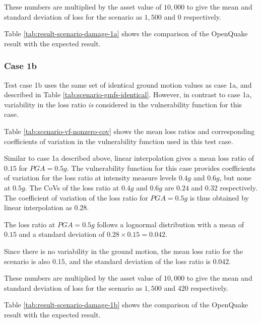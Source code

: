 These numbers are multiplied by the asset value of $10,000$ to give the mean and standard deviation of loss for the scenario as $1,500$ and $0$ respectively.



Table \ref{tab:result-scenario-damage-1a} shows the comparison of the OpenQuake result with the expected result.

\subsubsection{Case 1b}
Test case 1b uses the same set of identical ground motion values as case 1a, and described in Table \ref{tab:scenario-gmfs-identical}. However, in contrast to case 1a, variability in the loss ratio \emph{is} considered in the vulnerability function for this case.



Table \ref{tab:scenario-vf-nonzero-cov} shows the mean loss ratios and corresponding coefficients of variation in the vulnerability function used in this test case.

Similar to case 1a described above, linear interpolation gives a mean loss ratio of $0.15$ for $PGA = 0.5 g$. The vulnerability function for this case provides coefficients of variation for the loss ratio at intensity measure levels $0.4 g$ and $0.6 g$, but none at $0.5 g$. The CoVs of the loss ratio at $0.4 g$ and $0.6 g$ are $0.24$ and $0.32$ respectively. The coefficient of variation of the loss ratio for $PGA = 0.5 g$ is thus obtained by linear interpolation as $0.28$.

The loss ratio at $PGA = 0.5 g$ follows a lognormal distribution with a mean of $0.15$ and a standard deviation of $0.28 \times 0.15 = 0.042$.

Since there is no variability in the ground motion, the mean loss ratio for the scenario is also $0.15$, and the standard deviation of the loss ratio is $0.042$.

These numbers are multiplied by the asset value of $10,000$ to give the mean and standard deviation of loss for the scenario as $1,500$ and $420$ respectively.



Table \ref{tab:result-scenario-damage-1b} shows the comparison of the OpenQuake result with the expected result.

